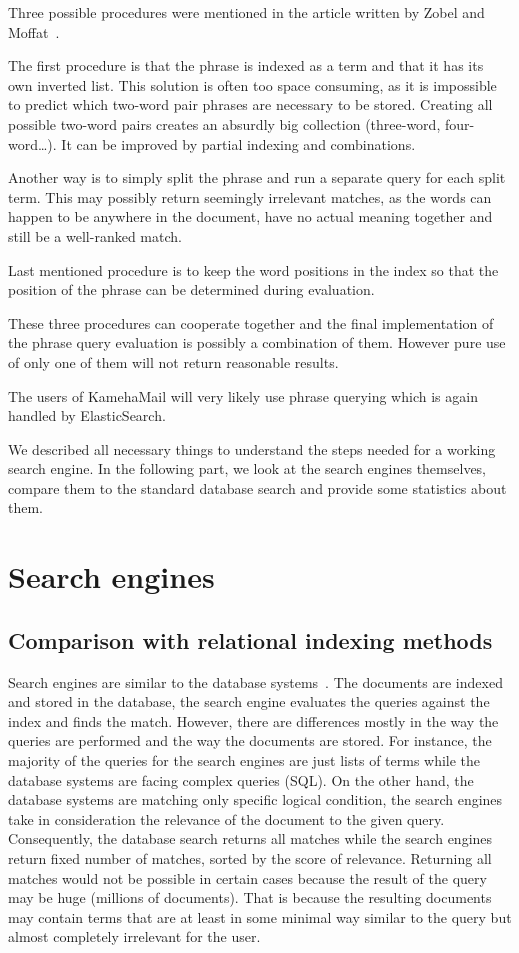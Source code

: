 Three possible procedures were mentioned in the article written by Zobel and Moffat~\cite{invertedfiles}.

The first procedure is that the phrase is indexed as a term and that it has its own inverted list. This solution is often too space consuming, as it is impossible to predict which two-word pair phrases are necessary to be stored. Creating all possible two-word pairs creates an absurdly big collection (three-word, four-word\dots). It can be improved by partial indexing and combinations.

Another way is to simply split the phrase and run a separate query for each split term. This may possibly return seemingly irrelevant matches, as the words can happen to be anywhere in the document, have no actual meaning together and still be a well-ranked match.

Last mentioned procedure is to keep the word positions in the index so that the position of the phrase can be determined during evaluation.

These three procedures can cooperate together and the final implementation of the phrase query evaluation is possibly a combination of them. However pure use of only one of them will not return reasonable results.

The users of KamehaMail will very likely use phrase querying which is again handled by ElasticSearch.

We described all necessary things to understand the steps needed for a working search engine. In the following part, we look at the search engines themselves, compare them to the standard database search and provide some statistics about them.

\section{Search engines}
\label{engines}

\subsection{Comparison with relational indexing methods}
Search engines are similar to the database systems~\cite{invertedfiles}. The documents are indexed and stored in the database, the search engine evaluates the queries against the index and finds the match. However, there are differences mostly in the way the queries are performed and the way the documents are stored. For instance, the majority of the queries for the search engines are just lists of terms while the database systems are facing complex queries (SQL). On the other hand, the database systems are matching only specific logical condition, the search engines take in consideration the relevance of the document to the given query. Consequently, the database search returns all matches while the search engines return fixed number of matches, sorted by the score of relevance. Returning all matches would not be possible in certain cases because the result of the query may be huge (millions of documents).
That is because the resulting documents may contain terms that are at least in some minimal way similar to the query but almost completely irrelevant for the user.

